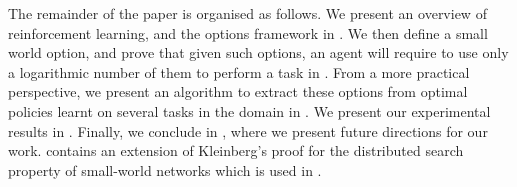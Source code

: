  The remainder of the paper is organised as
follows. We present an overview of reinforcement learning, and the
options framework in . We then define a small
world option, and prove that given such options, an agent will require
to use only a logarithmic number of them to perform a task in
. From a more practical perspective, we present an
algorithm to extract these options from optimal policies learnt on
several tasks in the domain in . We present our
experimental results in . Finally, we conclude
in , where we present future directions for our
work.  contains an extension of
Kleinberg's proof for the distributed search property of small-world
networks which is used in .

